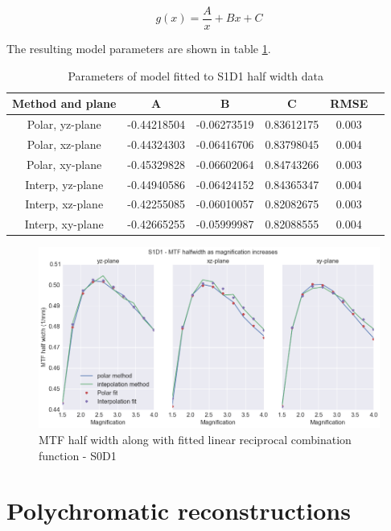 \documentclass[
  twoside,
  11pt, a4paper,
  footinclude=true,
  headinclude=true,
  cleardoublepage=empty
]{scrbook}
\begin{document}
\[
g(x) = \frac{A}{x} + Bx + C
\]

The resulting model parameters are shown in table \ref{explinhalffit}.

\begin{table}
\caption{Parameters of model fitted to S1D1 half width data}
\label{explinhalffit}
\begin{tabular}{c|ccccc}
\toprule
{} Method and plane &     A &     B  & C &  RMSE\\
\midrule
Polar, yz-plane     &    -0.44218504 & -0.06273519 & 0.83612175 & 0.003\\
Polar, xz-plane     &   -0.44324303 & -0.06416706 & 0.83798045  & 0.004\\
Polar, xy-plane     & -0.45329828 & -0.06602064 & 0.84743266  & 0.003\\
Interp, yz-plane     & -0.44940586 & -0.06424152 & 0.84365347  & 0.004\\
Interp, xz-plane     &  -0.42255085 & -0.06010057 & 0.82082675  & 0.003\\
Interp, xy-plane     &  -0.42665255 & -0.05999987 & 0.82088555   & 0.004\\
\bottomrule
\end{tabular}
\end{table}


\begin{figure}[h!]
  \centering
    \includegraphics[width=\textwidth]{code/MTF_and_PSF/MTF_Interp_Polar_Plots_files/MTF_Interp_Polar_Plots_8_1.png}
    \caption{MTF half width along with fitted linear reciprocal combination function - S0D1}
        \label{S1D1half}
\end{figure}





\section{Polychromatic reconstructions}
\end{document}
